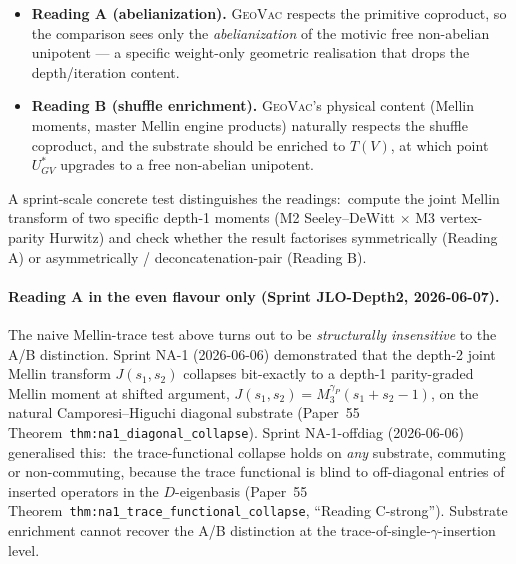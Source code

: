\documentclass[11pt,a4paper]{article}
\theoremstyle{plain}
\theoremstyle{definition}
\newcommand{\Ustar}{U^{*}}
\begin{document}
\begin{itemize}
\item \textbf{Reading A (abelianization).} \textsc{GeoVac} respects
the primitive coproduct, so the comparison sees only the
\emph{abelianization} of the motivic free non-abelian unipotent ---
a specific weight-only geometric realisation that drops the
depth/iteration content.
\item \textbf{Reading B (shuffle enrichment).} \textsc{GeoVac}'s
physical content (Mellin moments, master Mellin engine products)
naturally respects the shuffle coproduct, and the substrate should
be enriched to $T(V)$, at which point $\Ustar_{GV}$ upgrades to a
free non-abelian unipotent.
\end{itemize}

A sprint-scale concrete test distinguishes the readings:\ compute
the joint Mellin transform of two specific depth-1 moments (M2
Seeley--DeWitt $\times$ M3 vertex-parity Hurwitz) and check whether
the result factorises symmetrically (Reading A) or asymmetrically /
deconcatenation-pair (Reading B).

\paragraph{Reading A in the even flavour only (Sprint JLO-Depth2,
2026-06-07).}  The naive Mellin-trace test above turns out to be
\emph{structurally insensitive} to the A/B distinction.  Sprint NA-1
(2026-06-06) demonstrated that the depth-2 joint Mellin transform
$J(s_1, s_2)$ collapses bit-exactly to a depth-1 parity-graded
Mellin moment at shifted argument, $J(s_1, s_2) = M_3^{\gamma_P}(s_1 + s_2 - 1)$,
on the natural Camporesi--Higuchi diagonal substrate
(Paper~55~\cite{paper55} Theorem~\texttt{thm:na1\_diagonal\_collapse}).
Sprint NA-1-offdiag (2026-06-06) generalised this:\ the trace-functional
collapse holds on \emph{any} substrate, commuting or non-commuting,
because the trace functional is blind to off-diagonal entries of
inserted operators in the $D$-eigenbasis
(Paper~55~\cite{paper55}
Theorem~\texttt{thm:na1\_trace\_functional\_collapse},
``Reading C-strong'').  Substrate enrichment cannot recover the
A/B distinction at the trace-of-single-$\gamma$-insertion level.
\end{document}
